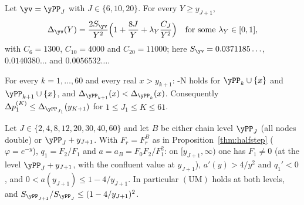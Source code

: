 \begin{proposition}\label{prop:Fremainder}
Let $\yv=\yPP_J$ with $J\in\{6,10,20\}$. For every $Y\ge y_{J+1}$,
\[
  \Delta_{\yv}(Y)=\frac{2S_{\yv}}{Y^2}\Bigl(1+\frac{8J}Y+\lambda_Y\frac{C_J}{Y^2}\Bigr)\quad\text{for some }\lambda_Y\in[0,1],
\]
with $C_6=1300$, $C_{10}=4000$ and $C_{20}=11000$; here $S_{\yv}=0.0371185\ldots$, $0.0140380\ldots$ and $0.0056532\ldots$.
\end{proposition}

\begin{proposition}\label{prop:SMset-cert}
For every $k=1,\dots,60$ and every real $x>y_{k+1}$: \hyp{N} holds for $\yPP_k\cup\{x\}$ and $\yPP_{k+1}\cup\{x\}$, and
$\Delta_{\yPP_{k+1}}(x)<\Delta_{\yPP_k}(x)$. Consequently $\Delta p_1^{(K)}\le\Delta_{\yPP_{J_1}}(y_{K+1})$ for
$1\le J_1\le K\le61$.
\end{proposition}

\begin{proposition}\label{prop:UM-cert}
Let $J\in\{2,4,8,12,20,30,40,60\}$ and let $B$ be either chain level $\yPP_J$ (all nodes double) or $\yPP_J+y_{J+1}$. With
$F_r=F_r^B$ as in Proposition~\ref{thm:halfstep} \textup{(}$\varphi=e^{-y}$\textup{)}, $q_1=F_2/F_1$ and $a=a_B=F_0F_2/F_1^2$: on
$[y_{J+1},\infty)$ one has $F_1\ne0$ \textup{(}at the level $\yPP_J+y_{J+1}$, with the confluent value at $y_{J+1}$\textup{)},
$a'(y)>4/y^2$ and $q_1'<0$, and $0<a(y_{J+1})\le1-4/y_{J+1}$. In particular
$(\mathrm{UM})$ holds at both levels, and $S_{\yPP_{J+1}}/S_{\yPP_J}\le(1-4/y_{J+1})^2$.
\end{proposition}

